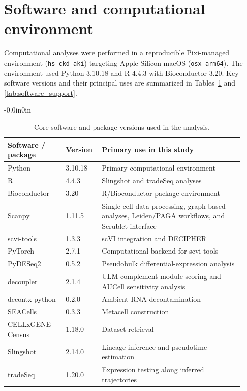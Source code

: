 \documentclass[10pt,letterpaper]{article}
\begin{document}
\pagebreak

\section*{Software and computational environment}

Computational analyses were performed in a reproducible Pixi-managed environment (\texttt{hs-ckd-aki}) targeting Apple Silicon macOS (\texttt{osx-arm64}). The environment used Python 3.10.18 and R 4.4.3 with Bioconductor 3.20. Key software versions and their principal uses are summarized in Tables~\ref{tab:software_core} and \ref{tab:software_support}.

\begin{table}[!ht]
\begin{adjustwidth}{-0.0in}{0in}
\centering
\caption{Core software and package versions used in the analysis.}
\label{tab:software_core}
\begin{tabular}{p{0.23\linewidth} p{0.13\linewidth} p{0.56\linewidth}}
\hline
\textbf{Software / package} & \textbf{Version} & \textbf{Primary use in this study} \\
\hline
Python & 3.10.18 & Primary computational environment \\
R & 4.4.3 & Slingshot and tradeSeq analyses \\
Bioconductor & 3.20 & R/Bioconductor package environment \\
Scanpy & 1.11.5 & Single-cell data processing, graph-based analyses, Leiden/PAGA workflows, and Scrublet interface \\
scvi-tools & 1.3.3 & scVI integration and DECIPHER \\
PyTorch & 2.7.1 & Computational backend for scvi-tools \\
PyDESeq2 & 0.5.2 & Pseudobulk differential-expression analysis \\
decoupler & 2.1.4 & ULM complement-module scoring and AUCell sensitivity analysis \\
decontx-python & 0.2.0 & Ambient-RNA decontamination \\
SEACells & 0.3.3 & Metacell construction \\
CELLxGENE Census & 1.18.0 & Dataset retrieval \\
Slingshot & 2.14.0 & Lineage inference and pseudotime estimation \\
tradeSeq & 1.20.0 & Expression testing along inferred trajectories \\
\hline
\end{tabular}
\end{adjustwidth}
\end{table}
\end{document}
